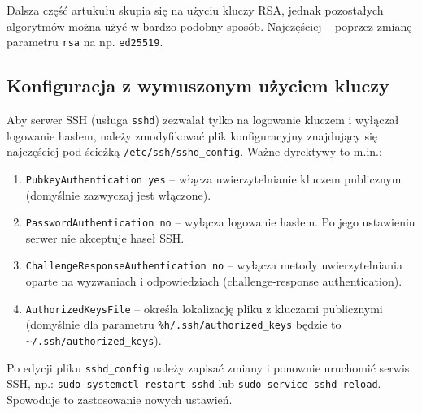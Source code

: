 \documentclass{article}
\begin{document}
\begin{multicols}{2}
Dalsza część artukułu skupia się na użyciu kluczy RSA, jednak pozostałych algorytmów można użyć w bardzo podobny sposób. Najczęściej -- poprzez zmianę parametru \verb|rsa| na np. \verb|ed25519|.

\subsection{Konfiguracja z wymuszonym użyciem kluczy}
Aby serwer SSH (usługa \verb|sshd|) zezwalał tylko na logowanie kluczem i wyłączał logowanie hasłem, należy zmodyfikować plik konfiguracyjny znajdujący się najczęściej pod ścieżką \verb|/etc/ssh/sshd_config|\cite{sshconfig}. Ważne dyrektywy to m.in.:
\begin{enumerate}
    \item \verb|PubkeyAuthentication yes| -- włącza uwierzytelnianie kluczem publicznym (domyślnie zazwyczaj jest włączone).
    
    \item \verb|PasswordAuthentication no| -- wyłącza logowanie hasłem. Po jego ustawieniu serwer nie akceptuje haseł SSH.

    \item \verb|ChallengeResponseAuthentication no| -- wyłącza metody uwierzytelniania oparte na wyzwaniach i odpowiedziach (challenge-response authentication).

    \item \verb|AuthorizedKeysFile| -- określa lokalizację pliku z kluczami publicznymi (domyślnie dla parametru \verb|%h/.ssh/authorized_keys| będzie to \verb|~/.ssh/authorized_keys|).
\end{enumerate}

Po edycji pliku \verb|sshd_config| należy zapisać zmiany i ponownie uruchomić serwis SSH, np.: \verb|sudo systemctl restart sshd| lub \verb|sudo service sshd reload|. Spowoduje to zastosowanie nowych ustawień. 

\end{multicols}
\end{document}
